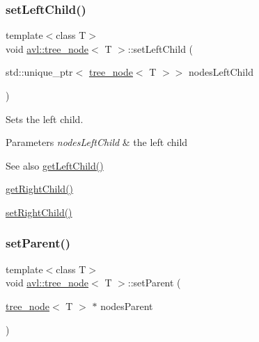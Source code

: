 \subsubsection{\texorpdfstring{set\+Left\+Child()}{setLeftChild()}}
{\footnotesize\ttfamily template$<$class T$>$ \\
void \hyperlink{classavl_1_1tree__node}{avl\+::tree\+\_\+node}$<$ T $>$\+::set\+Left\+Child (\begin{DoxyParamCaption}\item[{std\+::unique\+\_\+ptr$<$ \hyperlink{classavl_1_1tree__node}{tree\+\_\+node}$<$ T $>$$>$}]{nodes\+Left\+Child }\end{DoxyParamCaption})\hspace{0.3cm}{\ttfamily [inline]}}

Sets the left child. 
\begin{DoxyParams}{Parameters}
{\em nodes\+Left\+Child} & the left child \\
\hline
\end{DoxyParams}
\begin{DoxySeeAlso}{See also}
\hyperlink{classavl_1_1tree__node_ad12a5f6a41cfc6203913c5b6bce30837}{get\+Left\+Child()} 

\hyperlink{classavl_1_1tree__node_ac79592e64351573e622d0977002fc813}{get\+Right\+Child()} 

\hyperlink{classavl_1_1tree__node_a8b36f21d28a09858e32ba9f1b349994f}{set\+Right\+Child()} 
\end{DoxySeeAlso}
\mbox{\label{classavl_1_1tree__node_abd5de5986ecb86e8a07b007a51d8cbec}} 
\subsubsection{\texorpdfstring{set\+Parent()}{setParent()}}
{\footnotesize\ttfamily template$<$class T$>$ \\
void \hyperlink{classavl_1_1tree__node}{avl\+::tree\+\_\+node}$<$ T $>$\+::set\+Parent (\begin{DoxyParamCaption}\item[{\hyperlink{classavl_1_1tree__node}{tree\+\_\+node}$<$ T $>$ $\ast$}]{nodes\+Parent }\end{DoxyParamCaption})\hspace{0.3cm}{\ttfamily [inline]}}


